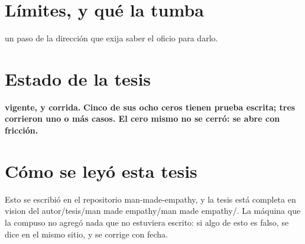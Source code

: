 \documentclass[11pt,a4paper]{article}
\begin{document}
\section{Límites, y qué la tumba}
un paso de la dirección que exija saber el oficio para darlo.

\section{Estado de la tesis}
\textbf{vigente, y corrida.} \textbf{Cinco de sus ocho ceros tienen prueba escrita; tres corrieron uno o más casos. El cero mismo no se cerró: se abre con fricción.}

\section*{Cómo se leyó esta tesis}
Esto se escribió en el repositorio man-made-empathy, y la tesis está completa en vision del autor/tesis/man made empathy/man made empathy/. La máquina que la compuso no agregó nada que no estuviera escrito: si algo de esto es falso, se dice en el mismo sitio, y se corrige con fecha.
\end{document}
